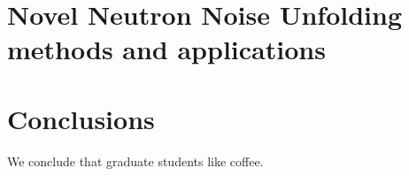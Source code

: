\documentclass{uiucthesis2021}
\newcounter{counterforappendices}
\begin{document}
\chapter{Novel Neutron Noise Unfolding methods and applications}


\chapter{Conclusions}


We conclude that graduate students like coffee.

\backmatter

\printbibliography[heading=bibintoc,title={References}]

\clearpage
\setcounter{counterforappendices}{\value{page}}
\mainmatter
\setcounter{page}{\value{counterforappendices}}




% 
\end{document}
